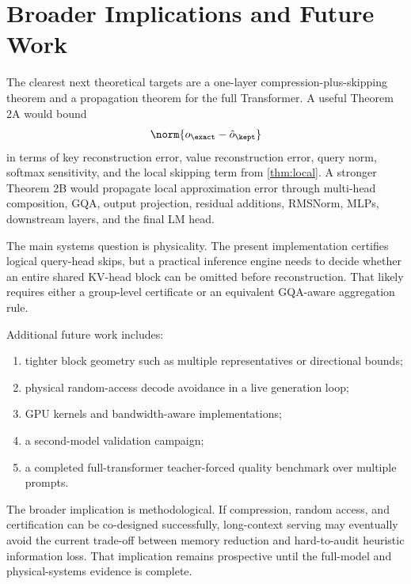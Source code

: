 \section{Broader Implications and Future Work}

The clearest next theoretical targets are a one-layer compression-plus-skipping theorem and a propagation theorem for the full Transformer. A useful Theorem 2A would bound
\begin{equation}
  \norm{o_\exact - \hat{o}_\kept}
\end{equation}
in terms of key reconstruction error, value reconstruction error, query norm, softmax sensitivity, and the local skipping term from \cref{thm:local}. A stronger Theorem 2B would propagate local approximation error through multi-head composition, GQA, output projection, residual additions, RMSNorm, MLPs, downstream layers, and the final LM head.

The main systems question is physicality. The present implementation certifies logical query-head skips, but a practical inference engine needs to decide whether an entire shared KV-head block can be omitted before reconstruction. That likely requires either a group-level certificate or an equivalent GQA-aware aggregation rule.

Additional future work includes:
\begin{enumerate}[label=\arabic*.]
  \item tighter block geometry such as multiple representatives or directional bounds;
  \item physical random-access decode avoidance in a live generation loop;
  \item GPU kernels and bandwidth-aware implementations;
  \item a second-model validation campaign;
  \item a completed full-transformer teacher-forced quality benchmark over multiple prompts.
\end{enumerate}

The broader implication is methodological. If compression, random access, and certification can be co-designed successfully, long-context serving may eventually avoid the current trade-off between memory reduction and hard-to-audit heuristic information loss. That implication remains prospective until the full-model and physical-systems evidence is complete.
